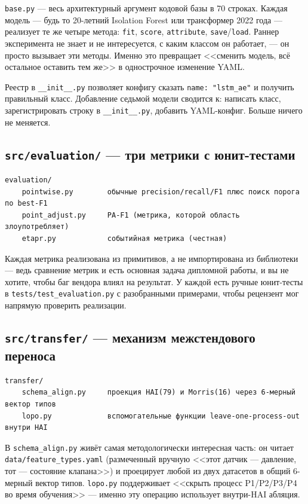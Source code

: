 \documentclass[11pt,a4paper]{article}
\newcommand{\code}[1]{\texttt{#1}}
\begin{document}
\code{base.py} --- весь архитектурный аргумент кодовой базы в 70 строках. Каждая модель --- будь то 20-летний Isolation Forest или трансформер 2022 года --- реализует те же четыре метода: \code{fit}, \code{score}, \code{attribute}, \code{save}/\code{load}. Раннер эксперимента не знает и не интересуется, с каким классом он работает, --- он просто вызывает эти методы. Именно это превращает <<сменить модель, всё остальное оставить тем же>> в однострочное изменение YAML.

Реестр в \code{\_\_init\_\_.py} позволяет конфигу сказать \code{name: "lstm\_ae"} и получить правильный класс. Добавление седьмой модели сводится к: написать класс, зарегистрировать строку в \code{\_\_init\_\_.py}, добавить YAML-конфиг. Больше ничего не меняется.

\subsection{\texttt{src/evaluation/} --- три метрики с юнит-тестами}

\begin{Verbatim}
evaluation/
    pointwise.py        обычные precision/recall/F1 плюс поиск порога по best-F1
    point_adjust.py     PA-F1 (метрика, которой область злоупотребляет)
    etapr.py            событийная метрика (честная)
\end{Verbatim}

Каждая метрика реализована из примитивов, а не импортирована из библиотеки --- ведь сравнение метрик и есть основная задача дипломной работы, и вы не хотите, чтобы баг вендора влиял на результат. У каждой есть ручные юнит-тесты в \code{tests/test\_evaluation.py} с разобранными примерами, чтобы рецензент мог напрямую проверить реализации.

\subsection{\texttt{src/transfer/} --- механизм межстендового переноса}

\begin{Verbatim}
transfer/
    schema_align.py     проекция HAI(79) и Morris(16) через 6-мерный вектор типов
    lopo.py             вспомогательные функции leave-one-process-out внутри HAI
\end{Verbatim}

В \code{schema\_align.py} живёт самая методологически интересная часть: он читает \code{data/feature\_types.yaml} (размеченный вручную <<этот датчик --- давление, тот --- состояние клапана>>) и проецирует любой из двух датасетов в общий 6-мерный вектор типов. \code{lopo.py} поддерживает <<скрыть процесс P1/P2/P3/P4 во время обучения>> --- именно эту операцию использует внутри-HAI абляция.
\end{document}
